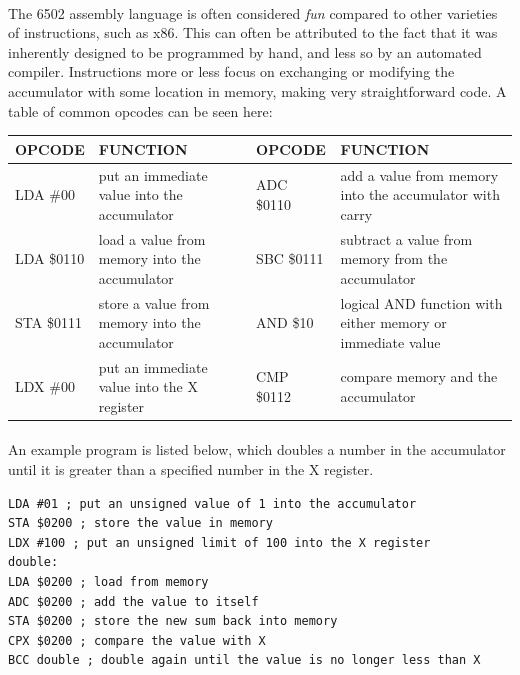 \documentclass{article}
\begin{document}
\paragraph{}
The 6502 assembly language is often considered \textit{fun} compared to other varieties of instructions, such as x86. This can often be attributed to the fact that it was inherently designed to be programmed by hand, and less so by an automated compiler. Instructions more or less focus on exchanging or modifying the accumulator with some location in memory, making very straightforward code. A table of common opcodes can be seen here:
    \begin{center}
    \begin{tabular}{|p{2cm}|p{5cm}|p{2cm}|p{5cm}|}
    \hline
    OPCODE & FUNCTION                                       & OPCODE & FUNCTION                                                   \\ \hline
    LDA \#00       & put an immediate value into the accumulator    & ADC \$0110     & add a value from memory into the accumulator with carry    \\ \hline
    LDA \$0110     & load a value from memory into the accumulator  & SBC \$0111     & subtract a value from memory from the accumulator          \\ \hline
    STA \$0111     & store a value from memory into the accumulator & AND \$10       & logical AND function with either memory or immediate value \\ \hline
    LDX \#00       & put an immediate value into the X register     & CMP \$0112     & compare memory and the accumulator                         \\ \hline
    \end{tabular}
    \end{center}

\paragraph{}
An example program is listed below, which doubles a number in the accumulator until it is greater than a specified number in the X register.

\begin{lstlisting}
LDA #01 ; put an unsigned value of 1 into the accumulator
STA $0200 ; store the value in memory
LDX #100 ; put an unsigned limit of 100 into the X register
double: 
LDA $0200 ; load from memory
ADC $0200 ; add the value to itself
STA $0200 ; store the new sum back into memory
CPX $0200 ; compare the value with X
BCC double ; double again until the value is no longer less than X
\end{lstlisting}
\end{document}

